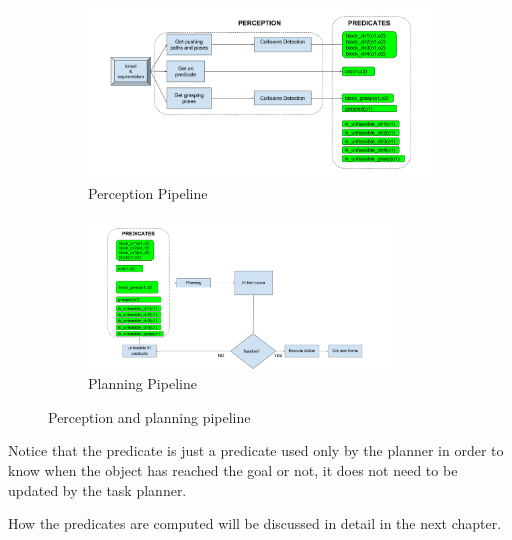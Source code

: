 \begin{figure}[t]
\centering
\begin{subfigure}[t]{\textwidth}
\centering
\includegraphics[width=\textwidth]{Img/planning/Pipeline1.png}
\caption{Perception Pipeline}\label{fig:pipeline1}
\end{subfigure}
\begin{subfigure}[t]{\textwidth}
\centering
\includegraphics[width=0.9\textwidth]{Img/planning/Pipeline2.png}
\caption{Planning Pipeline}\label{fig:pipeline2}
\end{subfigure}
\caption{Perception and planning pipeline}\label{fig:pipeline}
\end{figure}

Notice that the  predicate is just a predicate used only by the planner in order to know when the object has reached the goal or not, it does not need to be updated by the task planner. 

\mbox{}

How the predicates are computed will be discussed in detail in the next chapter.



